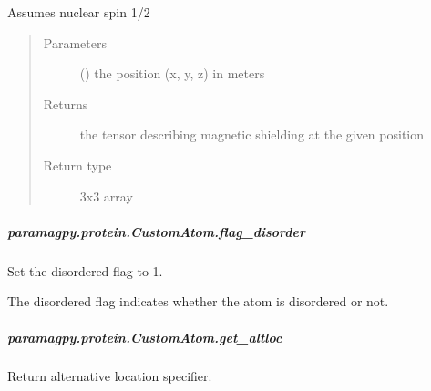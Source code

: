 \documentclass[a4paper,10pt,english,openany,oneside]{sphinxmanual}
\begin{document}
\begin{fulllineitems}
\begin{fulllineitems}
\begin{fulllineitems}
Assumes nuclear spin 1/2
\begin{quote}\begin{description}
\item[{Parameters}] \leavevmode
{} () \textendash{} the position (x, y, z) in meters

\item[{Returns}] \leavevmode
{} \textendash{} the tensor describing magnetic shielding at the given position

\item[{Return type}] \leavevmode
3x3 array

\end{description}\end{quote}

\end{fulllineitems}



\subparagraph{paramagpy.protein.CustomAtom.flag\_disorder}
\label{\detokenize{reference/generated/paramagpy.protein.CustomAtom.flag_disorder:paramagpy-protein-customatom-flag-disorder}}\label{\detokenize{reference/generated/paramagpy.protein.CustomAtom.flag_disorder::doc}}

\begin{fulllineitems}
\label{\detokenize{reference/generated/paramagpy.protein.CustomAtom.flag_disorder:paramagpy.protein.CustomAtom.flag_disorder}}
Set the disordered flag to 1.

The disordered flag indicates whether the atom is disordered or not.

\end{fulllineitems}



\subparagraph{paramagpy.protein.CustomAtom.get\_altloc}
\label{\detokenize{reference/generated/paramagpy.protein.CustomAtom.get_altloc:paramagpy-protein-customatom-get-altloc}}\label{\detokenize{reference/generated/paramagpy.protein.CustomAtom.get_altloc::doc}}

\begin{fulllineitems}
\label{\detokenize{reference/generated/paramagpy.protein.CustomAtom.get_altloc:paramagpy.protein.CustomAtom.get_altloc}}
Return alternative location specifier.


\end{fulllineitems}
\end{fulllineitems}
\end{fulllineitems}
\end{document}
